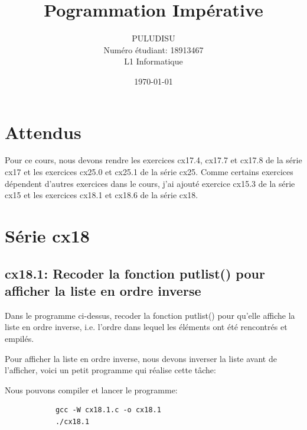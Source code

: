 \documentclass[a4paper,11pt]{article}
\title{Pogrammation Impérative}
\author{PULUDISU \bsc{Mpia Mimpiya}\\Numéro étudiant: 18913467 \\ L1 Informatique}
\date{\today}
\begin{document}
  \maketitle

  \tableofcontents

    \newpage
    \section{Attendus}
      \noindent Pour ce cours, nous devons rendre 
      les exercices cx17.4, cx17.7 et cx17.8 de la série cx17 et les exercices  cx25.0 et cx25.1 de la série cx25.
      Comme certains exercices dépendent d'autres exercices dans le cours, j'ai ajouté exercice cx15.3 de la série cx15 et les exercices cx18.1 et cx18.6 
      de la série cx18. 
       
    \newpage
    \section{Série cx18}
      \subsection{cx18.1: Recoder la fonction putlist() pour afficher la liste en ordre inverse}
        \noindent
        

        \noindent Dans le programme ci-dessus, recoder la fonction putlist() pour qu'elle affiche la liste en
        ordre inverse, i.e. l'ordre dans lequel les éléments ont été rencontrés et empilés.
        
        \bigskip
        \noindent Pour afficher la liste en ordre inverse, nous devons inverser la liste avant de l'afficher, 
        voici un petit programme qui réalise cette tâche: 

        

        \bigskip
        \noindent Nous pouvons compiler et lancer le programme: 
        \begin{tcolorbox}[colback=lightgray!6, colframe=black, left=-20mm, right=5mm, top=2mm, bottom=-2mm, boxrule=0.1mm]
          \begin{verbatim}
            gcc -W cx18.1.c -o cx18.1
            ./cx18.1
          \end{verbatim}
        \end{tcolorbox}
    
\end{document}
